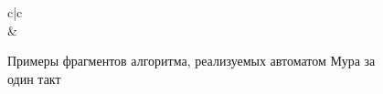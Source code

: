 \begin{figure}[!ht]
\begin{tabular}{c|c}
{            }
			\\
        {}
        &
            {}            
    \end{tabular}
    \caption{Примеры фрагментов алгоритма, реализуемых автоматом Мура за один такт}
    \label{fig::ch::practice::MooreAlg}
\end{figure}

